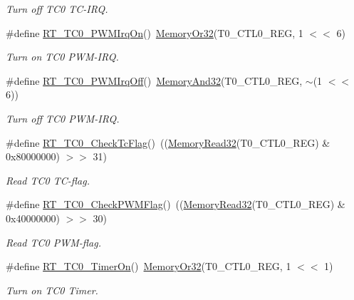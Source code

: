 \begin{DoxyCompactItemize}
\begin{DoxyCompactList}\small\item\em Turn off T\+C0 T\+C-\/\+I\+RQ. \end{DoxyCompactList}\item 
\#define \mbox{\hyperlink{a00041_a76c2b1a397b2035b2f2f2e64940b790f}{R\+T\+\_\+\+T\+C0\+\_\+\+P\+W\+M\+Irq\+On}}()~\mbox{\hyperlink{a00020_a9ea92ebccdef6bdaca4d00210cc7266d}{Memory\+Or32}}(T0\+\_\+\+C\+T\+L0\+\_\+\+R\+EG, 1 $<$$<$ 6)
\begin{DoxyCompactList}\small\item\em Turn on T\+C0 P\+W\+M-\/\+I\+RQ. \end{DoxyCompactList}\item 
\#define \mbox{\hyperlink{a00041_aa62df019b0279e8510e465f5e920f555}{R\+T\+\_\+\+T\+C0\+\_\+\+P\+W\+M\+Irq\+Off}}()~\mbox{\hyperlink{a00020_a5c1a2bd4c1bd4c2f429d8042a45327ff}{Memory\+And32}}(T0\+\_\+\+C\+T\+L0\+\_\+\+R\+EG, $\sim$(1 $<$$<$ 6))
\begin{DoxyCompactList}\small\item\em Turn off T\+C0 P\+W\+M-\/\+I\+RQ. \end{DoxyCompactList}\item 
\#define \mbox{\hyperlink{a00041_a41989522dd60679c7c86268b68363a5c}{R\+T\+\_\+\+T\+C0\+\_\+\+Check\+Tc\+Flag}}()~((\mbox{\hyperlink{a00020_a706b02571285f92589fbb0b964d7d0bb}{Memory\+Read32}}(T0\+\_\+\+C\+T\+L0\+\_\+\+R\+EG) \& 0x80000000) $>$$>$ 31)
\begin{DoxyCompactList}\small\item\em Read T\+C0 T\+C-\/flag. \end{DoxyCompactList}\item 
\#define \mbox{\hyperlink{a00041_ae20de59a971c4aa0a50a724ac08fb19e}{R\+T\+\_\+\+T\+C0\+\_\+\+Check\+P\+W\+M\+Flag}}()~((\mbox{\hyperlink{a00020_a706b02571285f92589fbb0b964d7d0bb}{Memory\+Read32}}(T0\+\_\+\+C\+T\+L0\+\_\+\+R\+EG) \& 0x40000000) $>$$>$ 30)
\begin{DoxyCompactList}\small\item\em Read T\+C0 P\+W\+M-\/flag. \end{DoxyCompactList}\item 
\#define \mbox{\hyperlink{a00041_aa7936fffa8b7bcd47751d2e89f81d4a9}{R\+T\+\_\+\+T\+C0\+\_\+\+Timer\+On}}()~\mbox{\hyperlink{a00020_a9ea92ebccdef6bdaca4d00210cc7266d}{Memory\+Or32}}(T0\+\_\+\+C\+T\+L0\+\_\+\+R\+EG, 1 $<$$<$ 1)
\begin{DoxyCompactList}\small\item\em Turn on T\+C0 Timer. \end{DoxyCompactList}\item 
$$
\end{DoxyCompactItemize}

